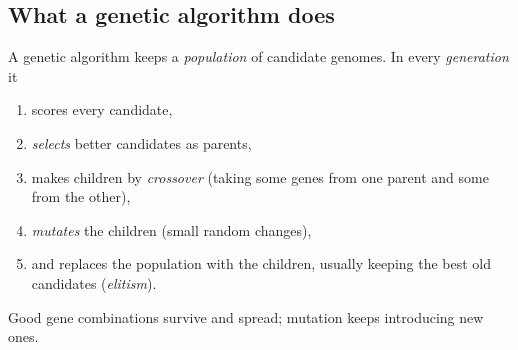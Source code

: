 \documentclass[10pt,a4paper]{article}
\begin{document}
\subsection{What a genetic algorithm does}
A genetic algorithm keeps a \emph{population} of candidate genomes. In every \emph{generation} it
\begin{enumerate}
\item scores every candidate,
\item \emph{selects} better candidates as parents,
\item makes children by \emph{crossover} (taking some genes from one parent and some from the other),
\item \emph{mutates} the children (small random changes),
\item and replaces the population with the children, usually keeping the best old candidates (\emph{elitism}).
\end{enumerate}
Good gene combinations survive and spread; mutation keeps introducing new ones.
\end{document}
